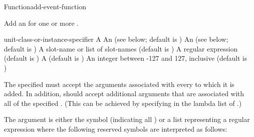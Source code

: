 \documentclass[10pt,twoside,english,pdftex]{article}
\begin{document}
\W\entities
\T\clearpage


\begin{functiondoc}{Function}{add-event-function}%
  { 
    \nobr{[\var{event-class-specifier\/}}
    \nobr{[\var{unit-class-or-instance-specifier\/}]]}
    }
%


\fnsyntax

\fnpurpose Add an  for one or more .

\fnpackage {}

\fnmodule {}

\fnargs
\begin{args}{unit-class-or-instance-specifier}
\arg[function] A 
 An  
(see below; default is )
 An 
(see below; default is )
 A slot-name or list
of slot-names (default is )
 A 
regular expression 
(default is \code{(*)})
\arg[permanent] A  (default is \nil)
\arg[priority] An integer between -127 and 127, inclusive (default is )
\end{args}

\fndsyntax
\W\supp\tabletop
\eventclassspec
\subeventingspec
\syntaxsep
\unitclassinstancespec
\subclassingspec

\fndescription 
The specified  must accept the arguments associated with every
 to which it is added.  In addition, 
should accept additional arguments that are associated with all
 of the specified . (This can be
achieved by specifying  in the lambda list of
.)

The  argument is either the symbol  (indicating
all ) or a list representing a regular
expression where the following reserved symbols are interpreted as
follows:
\spaceinstanceregexp


\end{functiondoc}
\end{document}
